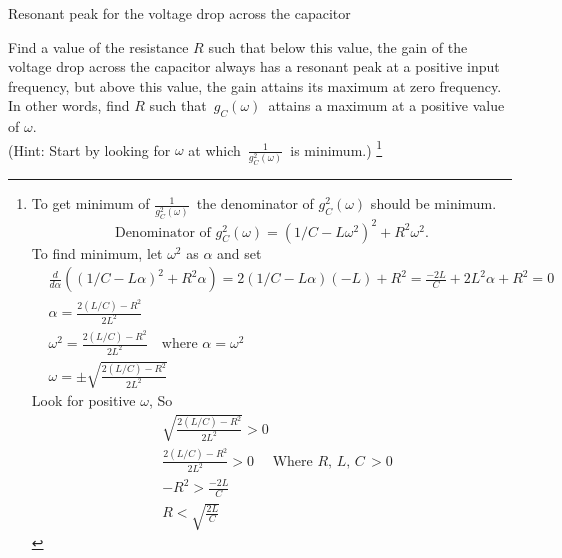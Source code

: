 \begin{exercise}
  Resonant peak for the voltage drop across the capacitor
\end{exercise}
Find a value of the resistance $R$ such that below this value,
the gain of the voltage drop across the capacitor always has a resonant peak
at a positive input frequency,
but above this value, the gain attains its maximum at zero frequency.
In other words, find $R$ such that $\, g_ C(\omega )\,$
attains a maximum at a positive value of $\omega$. \\
(Hint: Start by looking for $\omega$ at which $\, \displaystyle \frac{1}{g_ C^2(\omega )}\,$
is minimum.)  \footnote{
  To get minimum of $ \frac{1}{g_ C^2(\omega )}\,$ the denominator of  $g_ C^2(\omega )$ should be minimum. 
  \begin{equation*}
    \text{Denominator of } g_ C^2(\omega ) = (1/C - L\omega ^2) ^2 + R^2 \omega ^2. 
  \end{equation*}
  To find minimum, let $\omega ^2$ as $\alpha$ and set
  \begin{align*}
    &\frac{d}{d \alpha} \left( (1/C - L \alpha) ^2 + R^2 \alpha \right) = 
    2(1/C - L\alpha)(-L) + R^2 = \frac{-2L}{C} + 2L^2 \alpha + R^2 = 0\\
    &\alpha = \frac{2(L/C) -R^2}{2L^2} \\
    &\omega ^2 = \frac{2(L/C) -R^2}{2L^2} \quad \text{where } \alpha = \omega ^2\\
    &\omega = \pm \sqrt{\frac{2(L/C) -R^2}{2L^2}}
  \end{align*}
  Look for positive $\omega$, So
  \begin{align*}
    &\sqrt{\frac{2(L/C) -R^2}{2L^2}} > 0 \\
    &\frac{2(L/C) -R^2}{2L^2} > 0 \quad \text{ Where } R,\, L,\, C\, > 0 \\
    &-R ^2 > \frac{-2L}{C} \\
    &R < \sqrt{\frac{2L}{C}}
  \end{align*}
} \\

